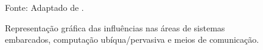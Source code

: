   \begin{figure}[H]
    \begin{center}  
    \caption{Representação gráfica das influências nas áreas de sistemas
    embarcados, computação ubíqua/pervasiva e meios de comunicação.}
         
        \label{fig:ubiqua-diagram}
      \par
      Fonte: Adaptado de \cite{marwedel2010embedded}.
    \end{center}
  \end{figure}
